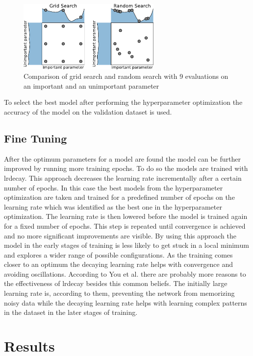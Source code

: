 \documentclass[conference]{IEEEtran}
\begin{document}
\begin{figure}[htp]
	\centering
	\includegraphics[width=7cm]{grid_search_random_search.pdf}
	\caption{Comparison of grid search and random search with 9 evaluations on an important and an unimportant parameter  \cite{Feurer2019}}
	\label{fig:grid_search_random_search}
\end{figure}

To select the best model after performing the hyperparameter optimization the accuracy of the model on the validation dataset is used.

\subsection{Fine Tuning}
\label{sec:fine_tuning}

After the optimum parameters for a model are found the model can be further improved by running more training epochs. To do so the models are trained with \gls{lrdecay}. This approach decreases the learning rate incrementally after a certain number of epochs.
In this case the best models from the hyperparameter optimization are taken and trained for a predefined number of epochs on the learning rate which was identified as the best one in the hyperparameter optimization. The learning rate is then lowered before the model is trained again for a fixed number of epochs. This step is repeated until convergence is achieved and no more significant improvements are visible. By using this approach the model in the early stages of training is less likely to get stuck in a local minimum and explores a wider range of possible configurations. As the training comes closer to an optimum the decaying learning rate helps with convergence and avoiding oscillations. According to You et al. \cite{You2019} there are probably more reasons to the effectiveness of \gls{lrdecay} besides this common beliefs. The initially large learning rate is, according to them, preventing the network from memorizing noisy data while the decaying learning rate helps with learning complex patterns in the dataset in the later stages of training.

\section{Results}
\label{sec:results}
\end{document}
